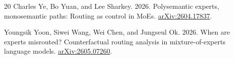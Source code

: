 \documentclass[10pt,a4paper,twocolumn]{article}
\begin{document}
\begin{thebibliography}{20}
Charles Ye, Bo Yuan, and Lee Sharkey. 2026. Polysemantic experts, monosemantic
paths: Routing as control in MoEs. \href{https://arxiv.org/abs/2604.17837}{arXiv:2604.17837}.

Youngsik Yoon, Siwei Wang, Wei Chen, and Jungseul Ok. 2026. When are experts
misrouted? Counterfactual routing analysis in mixture-of-experts language
models. \href{https://arxiv.org/abs/2605.07260}{arXiv:2605.07260}.

\end{thebibliography}
\end{document}
